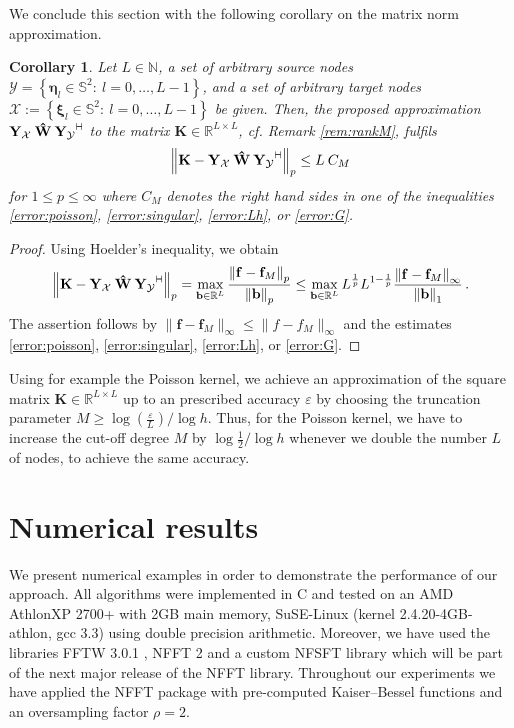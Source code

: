 \documentclass[11pt,a4paper,twoside,bibtotoc]{scrartcl}
\theoremstyle{plain}
\newtheorem{corollary}[theorem]{Corollary}
\theoremstyle{definition}
\theoremstyle{remark}
\newcommand{\N}{\ensuremath{\mathbb{N}}}
\newcommand{\R}{\ensuremath{\mathbb{R}}}
\newcommand{\adj}{{\vdash \hspace*{-1.72mm} \dashv}}
\numberwithin{equation}{section}
\numberwithin{table}{section}
\numberwithin{figure}{section}
\begin{document}
We conclude this section with the following corollary on the matrix norm
approximation.
\begin{corollary}
  \label{cor:rankapprox}
  Let $L \in \N$, a set of arbitrary source nodes $\mathcal{Y} =
  \left\{\mathbf{\eta}_{l} \in \mathbb{S}^2:\ l = 0,\ldots,L-1\right\}$, and a set of
  arbitrary target nodes $\mathcal{X} := \left\{\mathbf{\xi}_{l} \in
  \mathbb{S}^2:\ l=0,\ldots,L-1\right\}$ be given.
  Then, the proposed approximation $\mathbf{Y_{\mathcal{X}}} \: \mathbf{\hat W} \:
  \mathbf{Y_{\mathcal{Y}}}^{\adj}$ to the matrix $\mathbf{K}\in
  \R^{L\times L}$, cf. Remark
  \ref{rem:rankM}, fulfils
  \begin{equation*}
    \left\| \mathbf{K} - \mathbf{Y_{\mathcal{X}}} \: \mathbf{\hat W} \:
      \mathbf{Y_{\mathcal{Y}}}^{\adj} \right\|_p
    \le L \: C_M
  \end{equation*}
  for $1\le p \le \infty$ where $C_M$ denotes the right hand sides in one of
  the inequalities \eqref{error:poisson}, \eqref{error:singular},
  \eqref{error:Lh}, or \eqref{error:G}. 
\end{corollary}
\begin{proof}
 Using Hoelder's inequality, we obtain
 \[
 \left\| \mathbf{K} - \mathbf{Y_{\mathcal{X}}} \: \mathbf{\hat W} \:
   \mathbf{Y_{\mathcal{Y}}}^{\adj} \right\|_p
 = \max_{\mathbf{b}\in \R^L} \frac{\left\|\mathbf{f} -
     \mathbf{f}_{M}\right\|_{p}}{\left\|\mathbf{b}\right\|_p}
 \le \max_{\mathbf{b}\in \R^L} L^{\frac{1}{p}} L^{1-\frac{1}{p}} \frac{\left\|\mathbf{f}
     - \mathbf{f}_{M}\right\|_{\infty}}{\left\|\mathbf{b}\right\|_1}\,.
 \]
 The assertion follows by $\|\mathbf{f} - \mathbf{f}_{M}\|_{\infty} \le
  \|f-f_M\|_{\infty}$ and the estimates
  \eqref{error:poisson}, \eqref{error:singular}, \eqref{error:Lh}, or
  \eqref{error:G}.
\end{proof}

Using for example the Poisson kernel, we achieve an approximation of the square matrix
$\mathbf{K}\in\R^{L \times L}$ up to an prescribed accuracy $\varepsilon$ by
choosing the truncation parameter $M\ge \log(\frac{\varepsilon}{L}) /\log h$.
Thus, for the Poisson kernel, we have to increase the cut-off degree $M$ by
$\log\frac{1}{2} / \log h$ whenever we double the number $L$ of nodes, to achieve
the same accuracy.

\section{Numerical results}
We present numerical examples in order to demonstrate the performance of
our approach. All algorithms were implemented in C and tested on an 
AMD Athlon\texttrademark XP 2700+ with 2GB main memory, SuSE-Linux 
(kernel 2.4.20-4GB-athlon, gcc 3.3) using double precision arithmetic. 
Moreover, we have used the libraries FFTW 3.0.1 \cite{fftw}, NFFT 2
\cite{kupo02C} and a custom NFSFT library which will be part of the next 
major release of the NFFT library. Throughout our experiments we have 
applied the NFFT package \cite{kupo02C} with pre-computed Kaiser--Bessel 
functions and an oversampling factor $\rho=2$.
\end{document}
